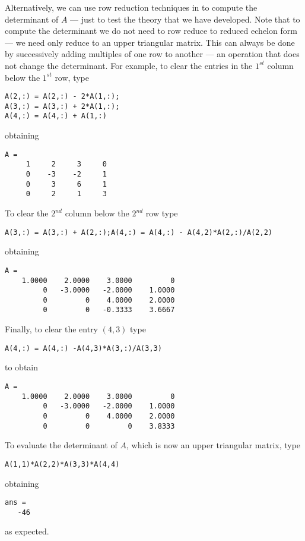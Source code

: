 Alternatively, we can use row reduction techniques in \Matlab to
compute the determinant of $A$ --- just to test the theory that
we have developed.  Note that to compute the determinant we do
not need to row reduce to 
reduced echelon form --- we need only
reduce to an upper triangular matrix.  This can always be done
by successively adding multiples of one row to another --- an
operation that does not change the determinant.  For example,
to clear the entries in the $1^{st}$ column below the $1^{st}$
row, type
\begin{verbatim}
A(2,:) = A(2,:) - 2*A(1,:);
A(3,:) = A(3,:) + 2*A(1,:); 
A(4,:) = A(4,:) + A(1,:)
\end{verbatim}
obtaining 
\begin{verbatim}
A =
     1     2     3     0
     0    -3    -2     1
     0     3     6     1
     0     2     1     3
\end{verbatim}
To clear the $2^{nd}$ column below the $2^{nd}$ row type 
\begin{verbatim}
A(3,:) = A(3,:) + A(2,:);A(4,:) = A(4,:) - A(4,2)*A(2,:)/A(2,2)\end{verbatim}
obtaining
\begin{verbatim}
A =
    1.0000    2.0000    3.0000         0
         0   -3.0000   -2.0000    1.0000
         0         0    4.0000    2.0000
         0         0   -0.3333    3.6667
\end{verbatim}
Finally, to clear the entry $(4,3)$ type
\begin{verbatim}
A(4,:) = A(4,:) -A(4,3)*A(3,:)/A(3,3)\end{verbatim}
to obtain
\begin{verbatim}
A =
    1.0000    2.0000    3.0000         0
         0   -3.0000   -2.0000    1.0000
         0         0    4.0000    2.0000
         0         0         0    3.8333
\end{verbatim}
To evaluate the determinant of $A$, which is now an upper
triangular matrix, type
\begin{verbatim}
A(1,1)*A(2,2)*A(3,3)*A(4,4)\end{verbatim}
obtaining
\begin{verbatim}
ans =
   -46
\end{verbatim}
as expected.

\EXER

\TEXER


